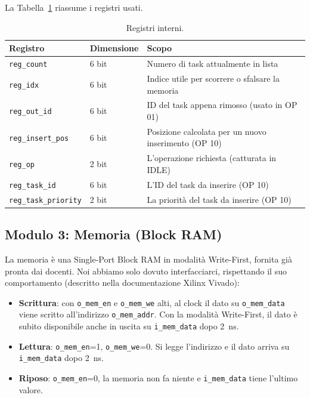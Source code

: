 \documentclass[a4paper,12pt]{article}
\begin{document}
La Tabella~\ref{tab:registri} riassume i registri usati.

\begin{table}[H]
\centering
\begin{tabular}{llp{7cm}}
\toprule
Registro & Dimensione & Scopo \\
\midrule
\texttt{reg\_count}       & 6 bit & Numero di task attualmente in lista \\
\texttt{reg\_idx}         & 6 bit & Indice utile per scorrere o sfalsare la memoria \\
\texttt{reg\_out\_id}     & 6 bit & ID del task appena rimosso (usato in OP 01) \\
\texttt{reg\_insert\_pos} & 6 bit & Posizione calcolata per un nuovo inserimento (OP 10) \\
\texttt{reg\_op}          & 2 bit & L'operazione richiesta (catturata in \newline IDLE) \\
\texttt{reg\_task\_id}    & 6 bit & L'ID del task da inserire (OP 10) \\
\texttt{reg\_task\_priority} & 2 bit & La priorità del task da inserire (OP 10) \\
\bottomrule
\end{tabular}
\caption{Registri interni.}
\label{tab:registri}
\end{table}

\subsection{Modulo 3: Memoria (Block RAM)}

La memoria è una Single-Port Block RAM in modalità Write-First, fornita già pronta dai docenti. Noi abbiamo solo dovuto interfacciarci, rispettando il suo comportamento (descritto nella documentazione Xilinx Vivado):

\begin{itemize}
    \item \textbf{Scrittura}: con \texttt{o\_mem\_en} e \texttt{o\_mem\_we} alti, al clock il dato su \texttt{o\_mem\_data} viene scritto all'indirizzo \texttt{o\_mem\_addr}. Con la modalità Write-First, il dato è subito disponibile anche in uscita su \texttt{i\_mem\_data} dopo 2~ns.
    \item \textbf{Lettura}: \texttt{o\_mem\_en}=1, \texttt{o\_mem\_we}=0. Si legge l'indirizzo e il dato arriva su \texttt{i\_mem\_data} dopo 2~ns.
    \item \textbf{Riposo}: \texttt{o\_mem\_en}=0, la memoria non fa niente e \texttt{i\_mem\_data} tiene l'ultimo valore.
\end{itemize}
\end{document}
